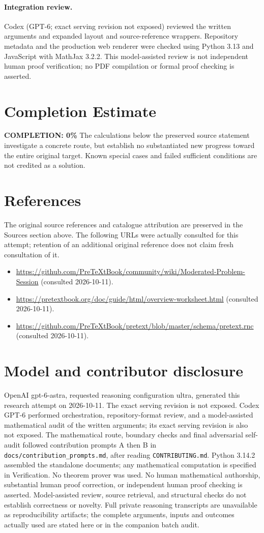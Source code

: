 \documentclass[11pt]{article}
\begin{document}
\paragraph{Integration review.} Codex (GPT-6; exact serving revision not exposed) reviewed the written arguments and expanded layout and source-reference wrappers. Repository metadata and the production web renderer were checked using Python 3.13 and JavaScript with MathJax 3.2.2. This model-assisted review is not independent human proof verification; no PDF compilation or formal proof checking is asserted.

\section{Completion Estimate}
\noindent\textbf{COMPLETION: 0\%}
The calculations below the preserved source statement investigate a concrete route,
but establish no substantiated new progress toward the entire original target.
Known special cases and failed sufficient conditions are not credited as a solution.
\section{References}
The original source references and catalogue attribution are preserved in the
Sources section above. The following URLs were actually consulted for this attempt;
retention of an additional original reference does not claim fresh consultation of it.
\begin{itemize}
\item \url{https://github.com/PreTeXtBook/community/wiki/Moderated-Problem-Session} (consulted 2026-10-11). 
\item \url{https://pretextbook.org/doc/guide/html/overview-worksheet.html} (consulted 2026-10-11). 
\item \url{https://github.com/PreTeXtBook/pretext/blob/master/schema/pretext.rnc} (consulted 2026-10-11). 
\end{itemize}
\section{Model and contributor disclosure}
OpenAI gpt-6-astra, requested reasoning configuration ultra, generated this research
attempt on 2026-10-11. The exact serving revision is not exposed. Codex GPT-6
performed orchestration, repository-format review, and a model-assisted mathematical
audit of the written arguments; its exact serving revision
is also not exposed. The mathematical route, boundary checks and final adversarial
self-audit followed contribution prompts A then B in
\texttt{docs/contribution\_prompts.md}, after reading \texttt{CONTRIBUTING.md}.
Python 3.14.2 assembled the standalone documents; any mathematical computation is
specified in Verification. No theorem prover was used. No human mathematical
authorship, substantial human proof correction, or independent human proof checking
is asserted. Model-assisted review, source retrieval, and structural checks do not
establish correctness or novelty. Full private reasoning transcripts are unavailable
as reproducibility artifacts; the complete arguments, inputs and outcomes actually
used are stated here or in the companion batch audit.
\end{document}
